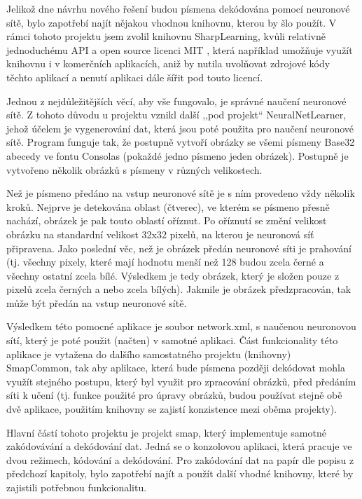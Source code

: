 \documentclass[conference]{IEEEtran}
\begin{document}
Jelikož dne návrhu nového řešení budou písmena dekódována pomocí neuronové sítě, bylo zapotřebí najít nějakou vhodnou knihovnu, kterou by šlo použít. V rámci tohoto projektu jsem zvolil knihovnu SharpLearning, kvůli relativně jednoduchému API a open source licenci MIT \cite{MITLicense}, která například umožňuje využít knihovnu i v komerčních aplikacích, aniž by nutila uvolňovat zdrojové kódy těchto aplikací a nenutí aplikaci dále šířit pod touto licencí.

Jednou z nejdůležitějších věcí, aby vše fungovalo, je správné naučení neuronové sítě. Z tohoto důvodu u projektu vznikl další ,,pod projekt`` NeuralNetLearner, jehož účelem je vygenerování dat, která jsou poté použita pro naučení neuronové sítě. Program funguje tak, že postupně vytvoří obrázky se všemi písmeny Base32 abecedy ve fontu Consolas (pokaždé jedno písmeno jeden obrázek). Postupně je vytvořeno několik obrázků s písmeny v různých velikostech. 

Než je písmeno předáno na vstup neuronové sítě je s ním provedeno vždy několik kroků. Nejprve je detekována oblast (čtverec), ve kterém se písmeno přesně nachází, obrázek je pak touto oblastí oříznut. Po oříznutí se změní velikost obrázku na standardní velikost 32x32 pixelů, na kterou je neuronová síť připravena. Jako poslední věc, než je obrázek předán neuronové síti je prahování (tj. všechny pixely, které mají hodnotu menší než 128 budou zcela černé a všechny ostatní zcela bílé. Výsledkem je tedy obrázek, který je složen pouze z pixelů zcela černých a nebo zcela bílých). Jakmile je obrázek předzpracován, tak může být předán na vstup neuronové sítě. 

Výsledkem této pomocné aplikace je soubor network.xml, s naučenou neuronovou sítí, který je poté použit (načten) v samotné aplikaci. Část funkcionality této aplikace je vytažena do dalšího samostatného projektu (knihovny) SmapCommon, tak aby aplikace, která bude písmena později dekódovat mohla využít stejného postupu, který byl využit pro zpracování obrázků, před předáním síti k učení (tj. funkce použité pro úpravy obrázků, budou používat stejně obě dvě aplikace, použitím knihovny se zajistí konzistence mezi oběma projekty).

Hlavní částí tohoto projektu je projekt smap, který implementuje samotné zakódovávání a dekódování dat. Jedná se o konzolovou aplikaci, která pracuje ve dvou režimech, kódování a dekódování. Pro zakódování dat na papír dle popisu z předchozí kapitoly, bylo zapotřebí najít a použít další vhodné knihovny, které by zajistili potřebnou funkcionalitu.
\end{document}

